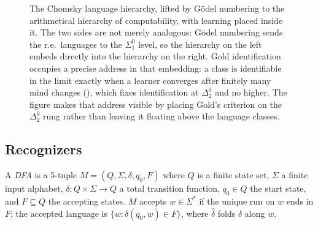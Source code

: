 \begin{figure}[ht]
{%
}
\caption[The language hierarchy lifted to the computability hierarchy, with learning inside it]{The Chomsky language hierarchy, lifted by G\"odel numbering to the arithmetical hierarchy of computability, with learning placed inside it. The two sides are not merely analogous: G\"odel numbering sends the r.e.\ languages to the $\Sigma^0_1$ level, so the hierarchy on the left embeds directly into the hierarchy on the right. Gold identification occupies a precise address in that embedding: a class is identifiable in the limit exactly when a learner converges after finitely many mind changes (), which fixes identification at $\Delta^0_2$ and no higher. The figure makes that address visible by placing Gold's criterion on the $\Delta^0_2$ rung rather than leaving it floating above the language classes.}
\label{fig:chomsky}
\end{figure}

\subsection{Recognizers}

\begin{defn}
\label{def:dfa}
A \emph{DFA} is a 5-tuple $M = (Q, \Sigma, \delta, q_0, F)$ where $Q$ is a finite state set, $\Sigma$ a finite input alphabet, $\delta : Q \times \Sigma \to Q$ a total transition function, $q_0 \in Q$ the start state, and $F \subseteq Q$ the accepting states. $M$ accepts $w \in \Sigma^\ast$ if the unique run on $w$ ends in $F$; the accepted language is $\{w : \hat\delta(q_0, w) \in F\}$, where $\hat\delta$ folds $\delta$ along $w$.
\end{defn}

